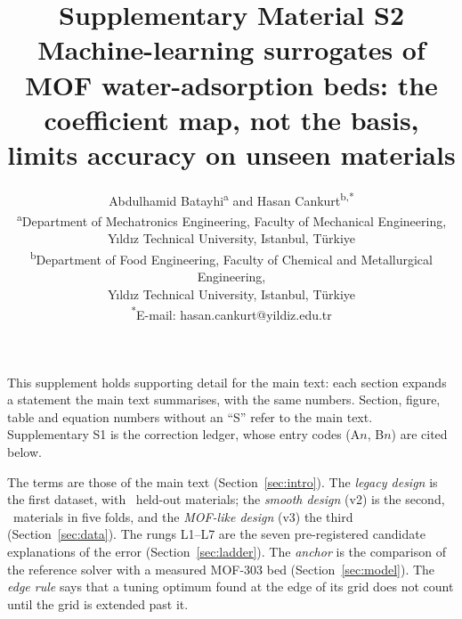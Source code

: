 \documentclass[11pt]{article}
\title{Supplementary Material S2\\[0.4em]\large Machine-learning surrogates of MOF water-adsorption beds: the coefficient map, not the basis, limits accuracy on unseen materials}
\author{Abdulhamid Batayhi\textsuperscript{a} and Hasan Cankurt\textsuperscript{b,*}\\[0.4em]
\small \textsuperscript{a}Department of Mechatronics Engineering, Faculty of Mechanical
Engineering,\\ \small Y\i{}ld\i{}z Technical University, Istanbul, T\"urkiye\\[0.2em]
\small \textsuperscript{b}Department of Food Engineering, Faculty of Chemical and Metallurgical
Engineering,\\ \small Y\i{}ld\i{}z Technical University, Istanbul, T\"urkiye\\[0.2em]
\small \textsuperscript{*}E-mail: hasan.cankurt@yildiz.edu.tr}
\date{}
\begin{document}
\maketitle

\noindent This supplement holds supporting detail for the main text: each section
expands a statement the main text summarises, with the same numbers. Section, figure,
table and equation numbers without an ``S'' refer to the main text. Supplementary S1 is
the correction ledger, whose entry codes (A\(n\), B\(n\)) are cited below.

The terms are those of the main text (Section~\ref{sec:intro}). The
\emph{legacy design} is the first dataset, with \nNclustLegacy\ held-out materials; the
\emph{smooth design} (v2) is the second, \nNclustFolds\ materials in five folds, and the
\emph{MOF-like design} (v3) the third
(Section~\ref{sec:data}). The rungs L1--L7 are the seven pre-registered candidate
explanations of the error (Section~\ref{sec:ladder}). The \emph{anchor} is the
comparison of the reference solver with a measured MOF-303 bed (Section~\ref{sec:model}).
The \emph{edge rule} says that a tuning optimum found at the edge of its grid does not
count until the grid is extended past it.






\end{document}

